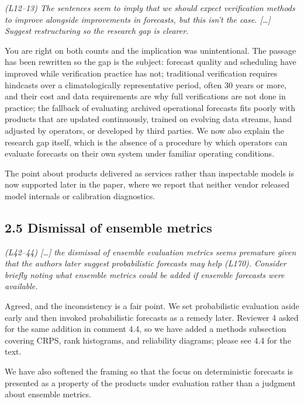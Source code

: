 \documentclass[11pt]{article}
\newenvironment{rc}%
  {\begin{list}{}{\setlength{\leftmargin}{1.5em}\setlength{\rightmargin}{1.5em}%
   \setlength{\topsep}{0.2em}\setlength{\parsep}{0pt}\setlength{\itemsep}{0pt}}%
   \item[]\itshape\color{quotegray}}%
  {\end{list}}
\begin{document}
\begin{rc}
(L12--13) The sentences seem to imply that we should expect verification methods to
improve alongside improvements in forecasts, but this isn't the case. [\ldots] Suggest
restructuring so the research gap is clearer.
\end{rc}

You are right on both counts and the implication was unintentional. The passage has been
rewritten so the gap is the subject: forecast quality and scheduling have improved while
verification practice has not; traditional verification requires hindcasts over a
climatologically representative period, often 30 years or more, and their cost and data
requirements are why full verifications are not done in practice; the fallback of evaluating
archived operational forecasts fits poorly with products that are updated continuously,
trained on evolving data streams, hand adjusted by operators, or developed by third parties.
We now also explain the research gap itself, which is the absence of a procedure by which
operators can evaluate forecasts on their own system under familiar operating conditions.

The point about products delivered as services rather than inspectable models is now
supported later in the paper, where we report that neither vendor released model internals or
calibration diagnostics.

\subsection*{2.5 Dismissal of ensemble metrics}

\begin{rc}
(L42--44) [\ldots] the dismissal of ensemble evaluation metrics seems premature given that
the authors later suggest probabilistic forecasts may help (L170). Consider briefly noting
what ensemble metrics could be added if ensemble forecasts were available.
\end{rc}

Agreed, and the inconsistency is a fair point. We set probabilistic evaluation aside early
and then invoked probabilistic forecasts as a remedy later. Reviewer 4 asked for the same
addition in comment 4.4, so we have added a methods subsection covering CRPS, rank
histograms, and reliability diagrams; please see 4.4 for the text.

We have also softened the framing so that the focus on deterministic forecasts is presented
as a property of the products under evaluation rather than a judgment about ensemble metrics.
\end{document}
